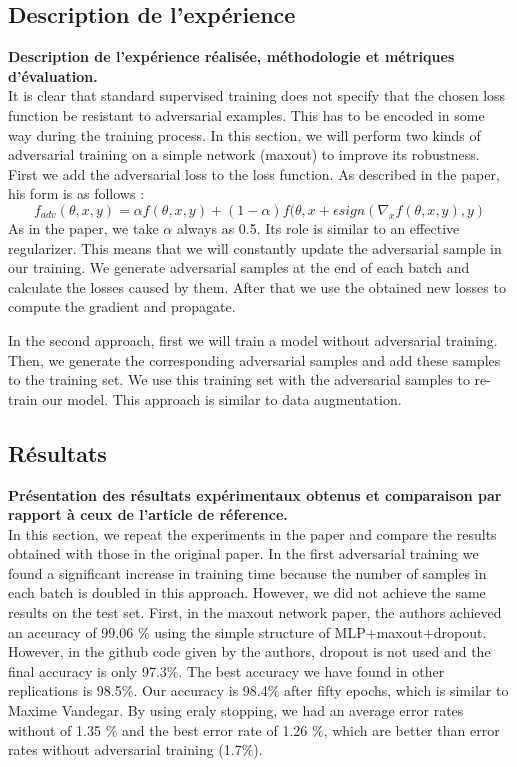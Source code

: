 

\subsection{Description de l'expérience}
\textbf{Description de l'expérience réalisée, méthodologie et métriques d'évaluation.} \\
It is clear that standard supervised training does not specify that the chosen loss function be resistant to adversarial examples. This has to be encoded in some way during the training process. In this section, we will perform two kinds of adversarial training on a simple network (maxout) to improve its robustness. First we add the adversarial loss to the loss function. As described in the paper, his form is as follows :
$$ f_{adv}(\theta,x,y) = \alpha f(\theta,x,y) +(1-\alpha )f(\theta,x+\epsilon sign(\nabla_{x}f(\theta,x,y),y) $$
As in the paper, we take $\alpha$ always as 0.5. Its role is similar to an effective regularizer. This means that we will constantly update the adversarial sample in our training. We generate adversarial samples at the end of each batch and calculate the losses caused by them. After that we use the obtained new losses to compute the gradient and propagate.

In the second approach, first we will train a model without adversarial training. Then, we generate the corresponding adversarial samples and add these samples to the training set. We use this training set with the adversarial samples to re-train our model. This approach is similar to data augmentation.


\subsection{Résultats}
\textbf{Présentation des résultats expérimentaux obtenus et  comparaison par rapport à ceux de l’article de réference.} \\
In this section, we repeat the experiments in the paper and compare the results obtained with those in the original paper. In the first adversarial training we found a significant increase in training time because the number of samples in each batch is doubled in this approach. However, we did not achieve the same results on the test set. First, in the maxout network paper, the authors achieved an accuracy of 99.06 $\%$ using the simple structure of MLP+maxout+dropout. However, in the github code given by the authors, dropout is not used and the final accuracy is only 97.3$\%$. The best accuracy we have found in other replications is 98.5$\%$. Our accuracy is 98.4$\%$ after fifty epochs, which is similar to Maxime Vandegar. By using eraly stopping, we had an average error rates without of 1.35 $\%$ and the best error rate of 1.26 $\%$, which are better than error rates without adversarial training (1.7$\%$).

